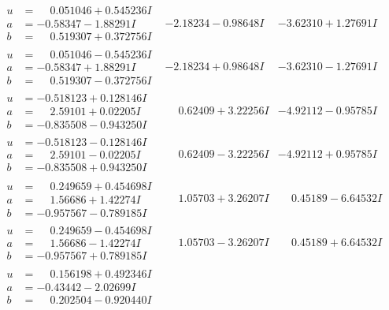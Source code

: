 \documentclass[1p]{elsarticle_modified}
\theoremstyle{definition}
\begin{document}
$$\begin{array}{c|c|c}
\begin{aligned}
u &= \phantom{-}0.051046 + 0.545236 I \\
a &= -0.58347 - 1.88291 I \\
b &= \phantom{-}0.519307 + 0.372756 I\end{aligned}
 & -2.18234 - 0.98648 I & -3.62310 + 1.27691 I \\ \hline\begin{aligned}
u &= \phantom{-}0.051046 - 0.545236 I \\
a &= -0.58347 + 1.88291 I \\
b &= \phantom{-}0.519307 - 0.372756 I\end{aligned}
 & -2.18234 + 0.98648 I & -3.62310 - 1.27691 I \\ \hline\begin{aligned}
u &= -0.518123 + 0.128146 I \\
a &= \phantom{-}2.59101 + 0.02205 I \\
b &= -0.835508 - 0.943250 I\end{aligned}
 & \phantom{-}0.62409 + 3.22256 I & -4.92112 - 0.95785 I \\ \hline\begin{aligned}
u &= -0.518123 - 0.128146 I \\
a &= \phantom{-}2.59101 - 0.02205 I \\
b &= -0.835508 + 0.943250 I\end{aligned}
 & \phantom{-}0.62409 - 3.22256 I & -4.92112 + 0.95785 I \\ \hline\begin{aligned}
u &= \phantom{-}0.249659 + 0.454698 I \\
a &= \phantom{-}1.56686 + 1.42274 I \\
b &= -0.957567 - 0.789185 I\end{aligned}
 & \phantom{-}1.05703 + 3.26207 I & \phantom{-}0.45189 - 6.64532 I \\ \hline\begin{aligned}
u &= \phantom{-}0.249659 - 0.454698 I \\
a &= \phantom{-}1.56686 - 1.42274 I \\
b &= -0.957567 + 0.789185 I\end{aligned}
 & \phantom{-}1.05703 - 3.26207 I & \phantom{-}0.45189 + 6.64532 I \\ \hline\begin{aligned}
u &= \phantom{-}0.156198 + 0.492346 I \\
a &= -0.43442 - 2.02699 I \\
b &= \phantom{-}0.202504 - 0.920440 I\end{aligned}

\end{array}$$
\end{document}
